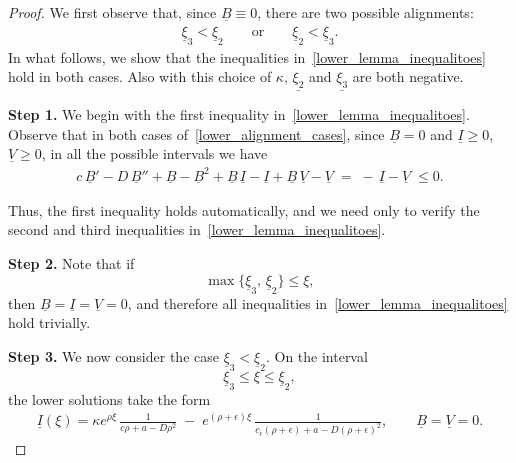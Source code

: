 \documentclass[11pt]{article}
\theoremstyle{definition}
\begin{document}
\begin{proof} 
We first observe that, since $\underline{B}\equiv 0$, there are two possible alignments:
\begin{align}\label{lower_alignment_cases}
    \underline{\xi}_{3} < \underline{\xi}_{2}
    \qquad \text{or} \qquad
    \underline{\xi}_{2} < \underline{\xi}_{3}.
\end{align}
In what follows, we show that the inequalities in~\eqref{lower_lemma_inequalitoes} hold in both cases. Also with this choice of $\kappa$, $\underline{\xi_2}$ and $\underline{ \xi_3}$ are both negative.

\textbf{Step 1.} We begin with the first inequality in~\eqref{lower_lemma_inequalitoes}.  
Observe that in both cases of~\eqref{lower_alignment_cases}, since $\underline{B}=0$ and $\underline{I}\ge 0$, $\underline{V}\ge 0$, in all the possible intervals we have
\begin{align}
    c\,\underline{B}' - D\,\underline{B}'' 
    + \underline{B} - \underline{B}^{2} 
    + \underline{B}\,\underline{I} 
    - \underline{I} 
    + \underline{B}\,\underline{V} 
    - \underline{V}
    \;=\; -\,\underline{I} - \underline{V} 
    \;\le 0.
\end{align}

Thus, the first inequality holds automatically, and we need only to verify the second and third inequalities in~\eqref{lower_lemma_inequalitoes}.

\textbf{Step 2.} Note that if 
\[
\max \{\underline{\xi}_{3},\, \underline{\xi}_{2}\} \le \xi,
\]
then $\underline{B}=\underline{I}=\underline{V}=0$, and therefore all inequalities in~\eqref{lower_lemma_inequalitoes} hold trivially.

\textbf{Step 3.} We now consider the case $\underline{\xi}_{3} < \underline{\xi}_{2}$.  
On the interval 
\[
\underline{\xi}_{3} \le \xi \le \underline{\xi}_{2},
\]
the lower solutions take the form
\begin{align}
    \underline{I}(\xi)
    = \kappa e^{\rho \xi}\,
      \frac{1}{c\rho + a - D\rho^{2}}
      \;-\;
      e^{(\rho+\epsilon)\xi}\,
      \frac{1}{c_{\epsilon}(\rho+\epsilon)+a-D(\rho+\epsilon)^{2}},
    \qquad 
    \underline{B} = \underline{V} = 0.
\end{align}


\end{proof}
\end{document}
